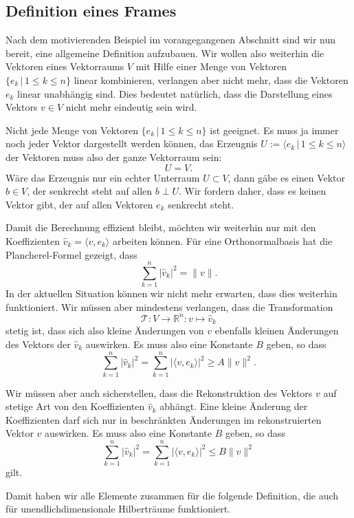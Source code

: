%
%
\subsection{Definition eines Frames}
Nach dem motivierenden Beispiel im vorangegangenen Abschnitt sind wir nun
bereit, eine allgemeine Definition aufzubauen.
Wir wollen also weiterhin die Vektoren eines Vektorraums $V$ mit Hilfe
einer Menge von Vektoren $\{e_k\,|\,1\le k\le n\}$ linear kombinieren,
verlangen aber nicht mehr, dass die Vektoren $e_k$ linear unabhängig sind.
Dies bedeutet natürlich, dass die Darstellung eines Vektors $v\in V$
nicht mehr eindeutig sein wird.

Nicht jede Menge von Vektoren $\{e_k\,|\,1\le k\le n\}$ ist geeignet.
Es muss ja immer noch jeder Vektor dargestellt werden können, das
Erzeugnis $U := \langle e_k\,|\,1\le k\le n\rangle$
der Vektoren muss also der ganze Vektorraum sein:
\[
U
=
V.
\]
Wäre das Erzeugnis nur ein echter Unterraum $U\subset V$, dann gäbe es
einen Vektor $b\in V$, der senkrecht steht auf allen $b\perp U$.
Wir fordern daher, dass es keinen Vektor gibt, der auf allen Vektoren $e_k$
senkrecht steht.

Damit die Berechnung effizient bleibt, möchten wir weiterhin nur mit den
Koeffizienten $\hat{v}_k = \langle v,e_k\rangle$ arbeiten können.
Für eine Orthonormalbasis hat die Plancherel-Formel gezeigt, dass
\[
\sum_{k=1}^n |\hat{v}_k|^2 = \| v \|.
\]
In der aktuellen Situation können wir nicht mehr erwarten, dass dies 
weiterhin funktioniert.
Wir müssen aber mindestens verlangen, dass die Transformation
\[
\mathcal{T}
\colon
V\to \mathbb R^n
:
v\mapsto \hat{v}_k
\]
stetig ist, dass sich also kleine Änderungen von $v$ ebenfalls
kleinen Änderungen des Vektors der $\hat{v}_k$ auswirken.
Es muss also eine Konstante $B$ geben, so dass
\[
\sum_{k=1}^n |\hat{v}_k|^2
=
\sum_{k=1}^n |\langle v,e_k\rangle|^2
\ge
A \| v \|^2.
\]

Wir müssen aber auch sicherstellen, dass die Rekonstruktion des Vektors $v$
auf stetige Art von den Koeffizienten $\hat{v}_k$ abhängt. 
Eine kleine Änderung der Koeffizienten darf sich nur in beschränkten Änderungen
im rekonstruierten Vektor $v$ auswirken.
Es muss also eine Konstante $B$ geben, so dass
\[
\sum_{k=1}^n |\hat{v}_k|^2
=
\sum_{k=1}^n |\langle v,e_k\rangle|^2
\le
B \| v \|^2
\]
gilt.

Damit haben wir alle Elemente zusammen für die folgende Definition,
die auch für unendlichdimensionale Hilberträume funktioniert.

